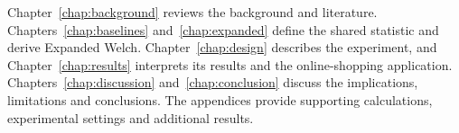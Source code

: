 Chapter~\ref{chap:background} reviews the background and literature.
Chapters~\ref{chap:baselines} and~\ref{chap:expanded} define the shared
statistic and derive Expanded Welch. Chapter~\ref{chap:design} describes
the experiment, and Chapter~\ref{chap:results} interprets its results and
the online-shopping application. Chapters~\ref{chap:discussion}
and~\ref{chap:conclusion} discuss the implications, limitations and
conclusions. The appendices provide supporting calculations, experimental
settings and additional results.
